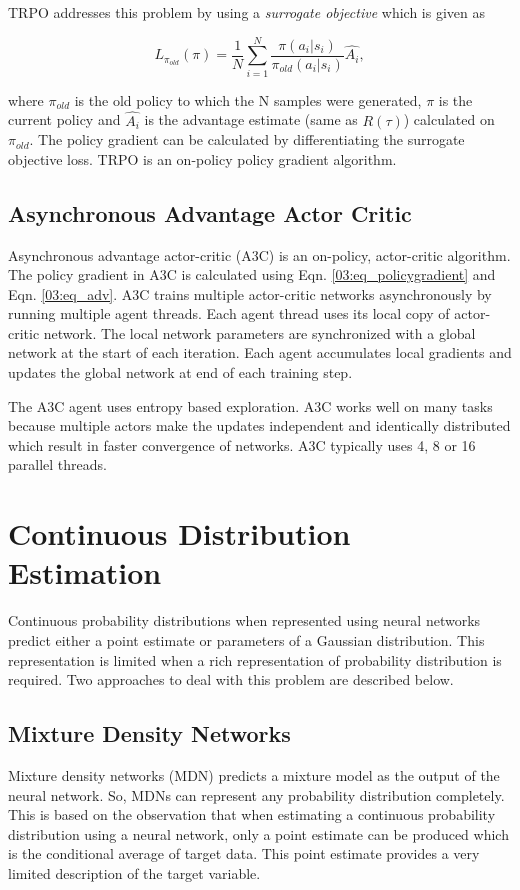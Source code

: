 TRPO addresses this problem by using a \textit{surrogate objective} which is given as 

\begin{equation}
L_{\pi_{old}}(\pi) = \dfrac{1}{N} \sum_{i=1}^N \dfrac{\pi(a_i|s_i)}{\pi_{old}(a_i|s_i)} \hat{A_i},
\end{equation}

where $\pi_{old}$ is the old policy to which the N samples were generated, $\pi$ is the current policy and $\hat{A_i}$ is the advantage estimate (same as $R(\tau)$) calculated on $\pi_{old}$. The policy gradient can be calculated by differentiating the surrogate objective loss. TRPO is an on-policy policy gradient algorithm.

\subsection{Asynchronous Advantage Actor Critic}
Asynchronous advantage actor-critic (A3C) \cite{a3c} is an on-policy, actor-critic algorithm. The policy gradient in A3C is calculated using Eqn. \ref{03:eq_policygradient} and Eqn. \ref{03:eq_adv}. A3C trains multiple actor-critic networks asynchronously by running multiple agent threads. Each agent thread uses its local copy of actor-critic network. The local network parameters are synchronized with a global network at the start of each iteration. Each agent accumulates local gradients and updates the global network at end of each training step.

The A3C agent uses entropy based exploration. A3C works well on many tasks because multiple actors make the updates independent and identically distributed which result in faster convergence of networks. A3C typically uses 4, 8 or 16 parallel threads.

\newpage
\section{Continuous Distribution Estimation}
Continuous probability distributions when represented using neural networks predict either a point estimate or parameters of a Gaussian distribution. This representation is limited when a rich representation of probability distribution is required. Two approaches to deal with this problem are described below.

\subsection{Mixture Density Networks}
Mixture density networks (MDN) \cite{bishop_mdn} predicts a mixture model as the output of the neural network. So, MDNs can represent any probability distribution completely. This is based on the observation that when estimating a continuous probability distribution using a neural network, only a point estimate can be produced which is the conditional average of target data. This point estimate provides a very limited description of the target variable.

